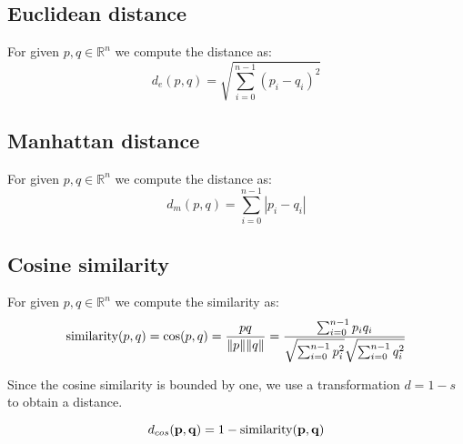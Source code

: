 \subsection{Euclidean distance}

For given $p, q \in \mathbb{R}^n$ we compute the distance as:
\begin{equation}
d_e({p},{q}) = \sqrt{\sum_{i=0}^{n-1} (p_i - q_i)^2}    
\end{equation}


\subsection{Manhattan distance}

For given $p, q \in \mathbb{R}^n$ we compute the distance as:
\begin{equation}
d_m({p},{q}) = {\sum_{i=0}^{n-1} |p_i - q_i|}    
\end{equation}


\subsection{Cosine similarity}

For given $p, q \in \mathbb{R}^n$ we compute the similarity as:
\begin{equation}
\text{similarity}({p},{q}) = \cos ({p},{q})= {{p} {q} \over \|{p}\| \|{q}\|} = \frac{ \sum_{i=0}^{n-1}{p_i q_i} }{ \sqrt{\sum_{i=0}^{n-1}{p_i^2}} \sqrt{\sum_{i=0}^{n-1}{q_i^2}} }
\end{equation}

Since the cosine similarity is bounded by one, we use a transformation $d = 1 - s$ to obtain a distance.

\begin{equation}
    d_{cos}({\bf p},{\bf q}) = 1 - \text{similarity}({\bf p},{\bf q})
\end{equation}